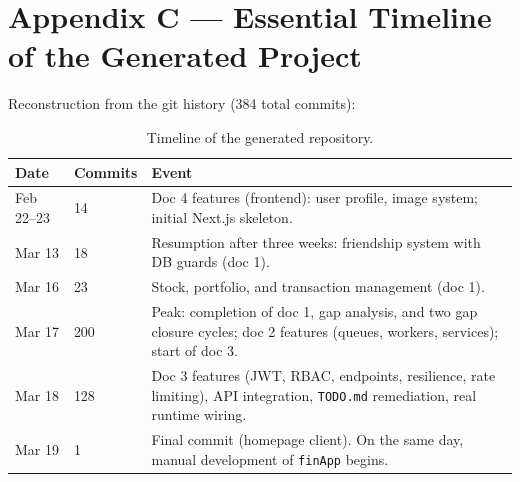 \documentclass[11pt,a4paper]{article}
\newcommand{\file}[1]{\texttt{\small #1}}
\begin{document}
	\section{Appendix C --- Essential Timeline of the Generated Project}
	
	Reconstruction from the git history (384 total commits):
	
	\begin{table}[H]
		\centering
		\small
		\begin{tabular}{llp{8.5cm}}
			\toprule
			\textbf{Date} & \textbf{Commits} & \textbf{Event} \\
			\midrule
			Feb 22--23 & 14 & Doc 4 features (frontend): user profile, image system; initial Next.js skeleton. \\
			Mar 13 & 18 & Resumption after three weeks: friendship system with DB guards (doc 1). \\
			Mar 16 & 23 & Stock, portfolio, and transaction management (doc 1). \\
			Mar 17 & 200 & Peak: completion of doc 1, gap analysis, and two gap closure cycles; doc 2 features (queues, workers, services); start of doc 3. \\
			Mar 18 & 128 & Doc 3 features (JWT, RBAC, endpoints, resilience, rate limiting), API integration, \file{TODO.md} remediation, real runtime wiring. \\
			Mar 19 & 1 & Final commit (homepage client). On the same day, manual development of \file{finApp} begins. \\
			\bottomrule
		\end{tabular}
		\caption{Timeline of the generated repository.}
	\end{table}
	
\end{document}
